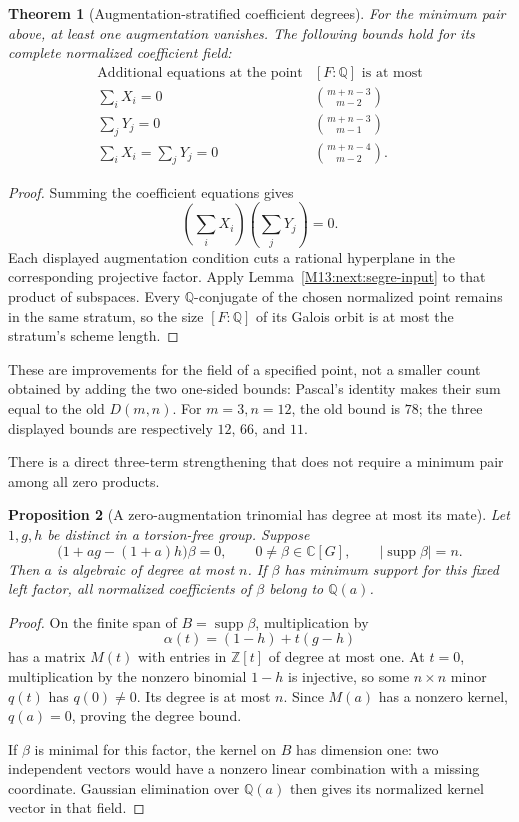 \documentclass[11pt,a4paper,oneside]{report}
\newtheorem{theorem}{Theorem}[section]
\newtheorem{proposition}[theorem]{Proposition}
\theoremstyle{definition}
\theoremstyle{remark}
\DeclareMathOperator{\supp}{supp}
\newcommand{\C}{\mathbb C}
\newcommand{\Q}{\mathbb Q}
\newcommand{\Z}{\mathbb Z}
\begin{document}
\begin{theorem}[Augmentation-stratified coefficient degrees]
\label{M13:next:augmentation-degree}
For the minimum pair above, at least one augmentation vanishes.
The following bounds hold for its complete normalized coefficient
field:
\[
\begin{array}{c|c}
\text{Additional equations at the point}&[F:\Q]\text{ is at most}\\
\hline
\sum_iX_i=0&\displaystyle\binom{m+n-3}{m-2}\\[5pt]
\sum_jY_j=0&\displaystyle\binom{m+n-3}{m-1}\\[5pt]
\sum_iX_i=\sum_jY_j=0&\displaystyle\binom{m+n-4}{m-2}.
\end{array}
\]
\end{theorem}
\begin{proof}
Summing the coefficient equations gives
\[
 \left(\sum_iX_i\right)\left(\sum_jY_j\right)=0.
\]
Each displayed augmentation condition cuts a rational hyperplane
in the corresponding projective factor. Apply
Lemma~\ref{M13:next:segre-input} to that product of subspaces. Every
$\Q$-conjugate of the chosen normalized point remains in the same
stratum, so the size $[F:\Q]$ of its Galois orbit is at most the
stratum's scheme length.
\end{proof}

These are improvements for the field of a specified point, not a
smaller count obtained by adding the two one-sided bounds: Pascal's
identity makes their sum equal to the old $D(m,n)$. For $m=3,n=12$,
the old bound is $78$; the three displayed bounds are respectively
$12$, $66$, and $11$.

There is a direct three-term strengthening that does not require a
minimum pair among all zero products.

\begin{proposition}[A zero-augmentation trinomial has degree at most its mate]
\label{M13:next:trinomial-degree}
Let $1,g,h$ be distinct in a torsion-free group. Suppose
\[
 \bigl(1+ag-(1+a)h\bigr)\beta=0,
 \qquad 0\ne\beta\in\C[G],\qquad |\supp\beta|=n.
\]
Then $a$ is algebraic of degree at most $n$. If $\beta$ has minimum
support for this fixed left factor, all normalized coefficients of
$\beta$ belong to $\Q(a)$.
\end{proposition}
\begin{proof}
On the finite span of $B=\supp\beta$, multiplication by
\[
 \alpha(t)=(1-h)+t(g-h)
\]
has a matrix $M(t)$ with entries in $\Z[t]$ of degree at most one.
At $t=0$, multiplication by the nonzero binomial $1-h$ is injective,
so some $n\times n$ minor $q(t)$ has $q(0)\ne0$.
Its degree is at most $n$. Since $M(a)$ has a nonzero kernel,
$q(a)=0$, proving the degree bound.

If $\beta$ is minimal for this factor, the kernel on $B$ has
dimension one: two independent vectors would have a nonzero linear
combination with a missing coordinate. Gaussian elimination over
$\Q(a)$ then gives its normalized kernel vector in that field.
\end{proof}
\end{document}

